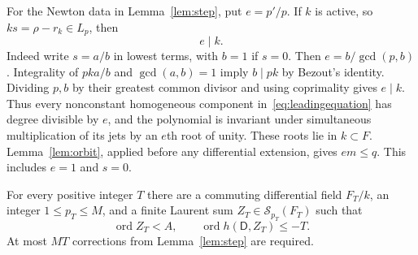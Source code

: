 \documentclass{article}
\newcommand{\DD}{\mathsf D}
\newcommand{\ord}{\operatorname{ord}}
\newcommand{\Sf}{\mathcal S}
\begin{document}
For the Newton data in Lemma~\ref{lem:step}, put $e=p'/p$. If $k$ is active, so $ks=\rho-r_k\in L_p$, then
\[
 e\mid k.\tag{5.3}\label{eq:denominator}
\]
Indeed write $s=a/b$ in lowest terms, with $b=1$ if $s=0$. Then $e=b/\gcd(p,b)$. Integrality of $pka/b$ and $\gcd(a,b)=1$ imply $b\mid pk$ by Bezout's identity. Dividing $p,b$ by their greatest common divisor and using coprimality gives $e\mid k$. Thus every nonconstant homogeneous component in~\eqref{eq:leadingequation} has degree divisible by $e$, and the polynomial is invariant under simultaneous multiplication of its jets by an $e$th root of unity. These roots lie in $k\subset F$. Lemma~\ref{lem:orbit}, applied before any differential extension, gives $em\leq q$. This includes $e=1$ and $s=0$.

\begin{proposition}\label{prop:finite}
For every positive integer $T$ there are a commuting differential field $F_T/k$, an integer $1\leq p_T\leq M$, and a finite Laurent sum $Z_T\in\Sf_{p_T}(F_T)$ such that
\[
 \ord Z_T<A,\qquad \ord h(\DD,Z_T)\leq-T.
 \tag{5.4}\label{eq:precision}
\]
At most $MT$ corrections from Lemma~\ref{lem:step} are required.
\end{proposition}
\end{document}
